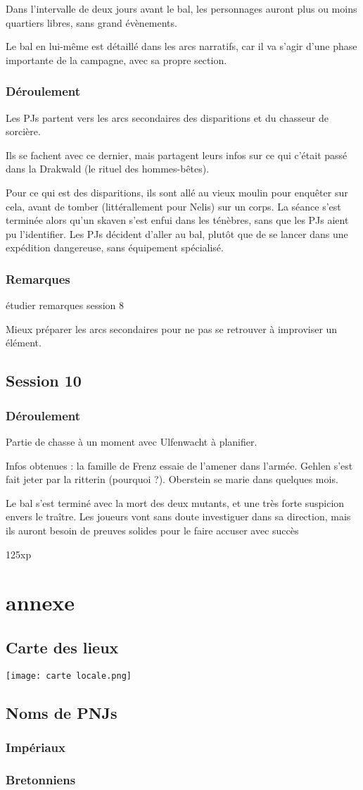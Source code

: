 \documentclass[10pt,a4paper]{book}
\begin{document}
Dans l'intervalle de deux jours avant le bal, les personnages auront plus ou moins quartiers libres, sans grand évènements.

Le bal en lui-même est détaillé dans les arcs narratifs, car il va s'agir d'une phase importante de la campagne, avec sa propre section.
\subsection{Déroulement}
Les PJs partent vers les arcs secondaires des disparitions et du chasseur de sorcière.

Ils se fachent avec ce dernier, mais partagent leurs infos sur ce qui c'était passé dans la Drakwald (le rituel des hommes-bêtes). 

Pour ce qui est des disparitions, ils sont allé au vieux moulin pour enquêter sur cela, avant de tomber (littérallement pour Nelis) sur un corps. La séance s'est terminée alors qu'un skaven s'est enfui dans les ténèbres, sans que les PJs aient pu l'identifier. Les PJs décident d'aller au bal, plutôt que de se lancer dans une expédition dangereuse, sans équipement spécialisé.
\subsection{Remarques}
étudier remarques session 8

Mieux préparer les arcs secondaires pour ne pas se retrouver à improviser un élément.
\section{Session 10}
\subsection{Déroulement}
Partie de chasse à un moment avec Ulfenwacht à planifier.

Infos obtenues : la famille de Frenz essaie de l'amener dans l'armée. Gehlen s'est fait jeter par la ritterin (pourquoi ?). Oberstein se marie dans quelques mois.

Le bal s'est terminé avec la mort des deux mutants, et une très forte suspicion envers le traître. Les joueurs vont sans doute investiguer dans sa direction, mais ils auront besoin de preuves solides pour le faire accuser avec succès

125xp
\chapter*{annexe}
\section{Carte des lieux}
\texttt{[image: carte locale.png]}
\section*{Noms de PNJs}
\subsection*{Impériaux}
\subsection*{Bretonniens}
\end{document}
